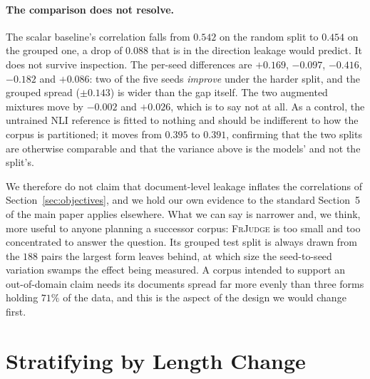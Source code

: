 \documentclass[11pt]{article}
\begin{document}
\begin{table}[t]\centering\small

\caption{Document-grouped split: no source form appears in both training and
test. Columns are as in Table~\ref{tab:models}, and the splits are size-matched
to it ($178/30/89$). The untrained NLI reference is recomputed on the grouped
splits rather than carried over, since a corpus-level correlation is not
comparable to a document-grouped one; the human ceiling is a property of the
annotations and does not depend on the split.}
\label{tab:models_grouped}
\end{table}

\paragraph{The comparison does not resolve.} The scalar baseline's correlation
falls from $0.542$ on the random split to $0.454$ on the grouped one, a drop of
$0.088$ that is in the direction leakage would predict. It does not survive
inspection. The per-seed differences are $+0.169$, $-0.097$, $-0.416$, $-0.182$
and $+0.086$: two of the five seeds \emph{improve} under the harder split, and
the grouped spread ($\pm0.143$) is wider than the gap itself. The two augmented
mixtures move by $-0.002$ and $+0.026$, which is to say not at all. As a
control, the untrained NLI reference is fitted to nothing and should be
indifferent to how the corpus is partitioned; it moves from $0.395$ to $0.391$,
confirming that the two splits are otherwise comparable and that the variance
above is the models' and not the split's.

We therefore do not claim that document-level leakage inflates the correlations
of Section~\ref{sec:objectives}, and we hold our own evidence to the standard
Section~5 of the main paper applies elsewhere. What we can say is narrower and, we
think, more useful to anyone planning a successor corpus: \textsc{FrJudge} is
too small and too concentrated to answer the question. Its grouped test split is
always drawn from the $188$ pairs the largest form leaves behind, at which size
the seed-to-seed variation swamps the effect being measured. A corpus intended
to support an out-of-domain claim needs its documents spread far more evenly
than three forms holding $71\%$ of the data, and this is the aspect of the
design we would change first.

\section{Stratifying by Length Change}
\label{app:buckets}
\end{document}
